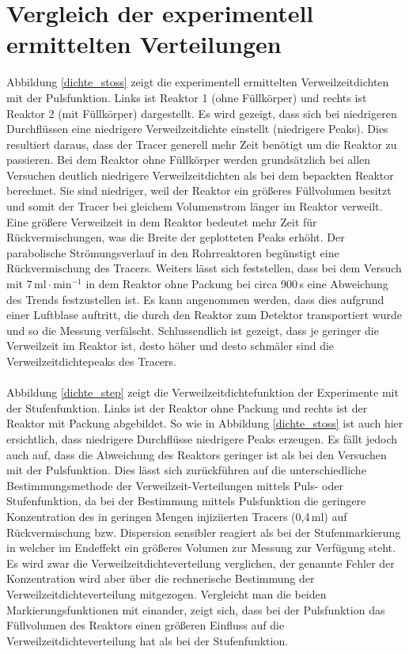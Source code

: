 \documentclass[12pt,liststotoc]{report}
\begin{document}
\newpage

\section{Vergleich der experimentell ermittelten Verteilungen}



Abbildung \ref{dichte_stoss} zeigt die experimentell ermittelten Verweilzeitdichten mit der Pulsfunktion. Links ist Reaktor 1 (ohne Füllkörper) und rechts ist Reaktor 2 (mit Füllkörper) dargestellt.  Es wird gezeigt, dass sich bei niedrigeren Durchflüssen eine niedrigere Verweilzeitdichte einstellt (niedrigere Peaks). Dies resultiert daraus, dass der Tracer generell mehr Zeit benötigt um die Reaktor zu passieren. Bei dem Reaktor ohne Füllkörper werden grundsätzlich bei allen Versuchen deutlich niedrigere Verweilzeitdichten als bei dem bepackten Reaktor berechnet. Sie sind niedriger, weil der Reaktor ein größeres Füllvolumen besitzt und somit der Tracer bei gleichem Volumenstrom länger im Reaktor verweilt. Eine größere Verweilzeit in dem Reaktor bedeutet mehr Zeit für Rückvermischungen, was die Breite der geplotteten Peaks erhöht. Der parabolische Strömungsverlauf in den Rohrreaktoren begünstigt eine Rückvermischung des Tracers. Weiters lässt sich feststellen, dass bei dem Versuch mit 7\,$\text{ml}\cdot\text{min}^{-1}$ in dem Reaktor ohne Packung bei circa 900\,s eine Abweichung des Trends festzustellen ist. Es kann angenommen werden, dass dies aufgrund einer Luftblase auftritt, die durch den Reaktor zum Detektor transportiert wurde und so die Messung verfälscht. Schlussendlich ist gezeigt, dass je geringer die Verweilzeit im Reaktor ist, desto höher und desto schmäler sind die Verweilzeitdichtepeaks des Tracers. 
\\
\\
Abbildung \ref{dichte_step} zeigt die Verweilzeitdichtefunktion der Experimente mit der Stufenfunktion. Links ist der Reaktor ohne Packung und rechts ist der Reaktor mit Packung abgebildet. So wie in Abbildung \ref{dichte_stoss} ist auch hier ersichtlich, dass niedrigere Durchflüsse niedrigere Peaks erzeugen. Es fällt jedoch auch auf, dass die Abweichung des Reaktors geringer ist als bei den Versuchen mit der Pulsfunktion. Dies lässt sich zurückführen auf die unterschiedliche Bestimmungsmethode der Verweilzeit-Verteilungen mittels Puls- oder Stufenfunktion, da bei der Bestimmung mittels Pulsfunktion die geringere Konzentration des in geringen Mengen injiziierten Tracers (0,4\,ml) auf Rückvermischung bzw. Dispersion sensibler reagiert als bei der Stufenmarkierung in welcher im Endeffekt ein größeres Volumen zur Messung zur Verfügung steht. Es wird zwar die Verweilzeitdichteverteilung verglichen, der genannte Fehler der Konzentration wird aber über die rechnerische Bestimmung der Verweilzeitdichteverteilung mitgezogen. Vergleicht man die beiden Markierungsfunktionen mit einander, zeigt sich, dass bei der Pulsfunktion das Füllvolumen des Reaktors einen größeren Einfluss auf die Verweilzeitdichteverteilung hat als bei der Stufenfunktion. 
\end{document}
